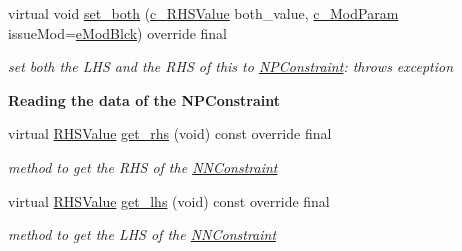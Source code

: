 \begin{Indent}
\begin{DoxyCompactItemize}
virtual void \mbox{\hyperlink{class_s_m_spp__di__unipi__it_1_1_n_p_constraint_aca9b52dad8cd2c7a830d2ebfe0ac31f3}{set\+\_\+both}} (\mbox{\hyperlink{class_s_m_spp__di__unipi__it_1_1_row_constraint_a34abd4b01d3a2024be5f6d13dd88779f}{c\+\_\+\+R\+H\+S\+Value}} both\+\_\+value, \mbox{\hyperlink{group___modification___t_y_p_e_s_ga544246d8c462e9a2d817c2c30797968f}{c\+\_\+\+Mod\+Param}} issue\+Mod=\mbox{\hyperlink{group___modification___t_y_p_e_s_gga48fddcdd03a03f49b7e389ca1ed938d4a21b14b26b1c0093a0905f6fc010bad29}{e\+Mod\+Blck}}) override final
\begin{DoxyCompactList}\small\item\em set both the L\+HS and the R\+HS of this to \mbox{\hyperlink{class_s_m_spp__di__unipi__it_1_1_n_p_constraint}{N\+P\+Constraint}}\+: throws exception \end{DoxyCompactList}\end{DoxyCompactItemize}
\end{Indent}
\begin{Indent}\textbf{ Reading the data of the N\+P\+Constraint}\par
\begin{DoxyCompactItemize}
\item 
\mbox{\label{class_s_m_spp__di__unipi__it_1_1_n_p_constraint_a492119664a2167a60aa99a4ad1146b03}} 
virtual \mbox{\hyperlink{class_s_m_spp__di__unipi__it_1_1_row_constraint_a8813536ab3b13a81c8e83a999ade3bd8}{R\+H\+S\+Value}} \mbox{\hyperlink{class_s_m_spp__di__unipi__it_1_1_n_p_constraint_a492119664a2167a60aa99a4ad1146b03}{get\+\_\+rhs}} (void) const override final
\begin{DoxyCompactList}\small\item\em method to get the R\+HS of the \mbox{\hyperlink{class_s_m_spp__di__unipi__it_1_1_n_n_constraint}{N\+N\+Constraint}} \end{DoxyCompactList}\item 
\mbox{\label{class_s_m_spp__di__unipi__it_1_1_n_p_constraint_ae3f29ca01d997a48a1b842f66f718ca2}} 
virtual \mbox{\hyperlink{class_s_m_spp__di__unipi__it_1_1_row_constraint_a8813536ab3b13a81c8e83a999ade3bd8}{R\+H\+S\+Value}} \mbox{\hyperlink{class_s_m_spp__di__unipi__it_1_1_n_p_constraint_ae3f29ca01d997a48a1b842f66f718ca2}{get\+\_\+lhs}} (void) const override final
\begin{DoxyCompactList}\small\item\em method to get the L\+HS of the \mbox{\hyperlink{class_s_m_spp__di__unipi__it_1_1_n_n_constraint}{N\+N\+Constraint}} \end{DoxyCompactList}\end{DoxyCompactItemize}
\end{Indent}
